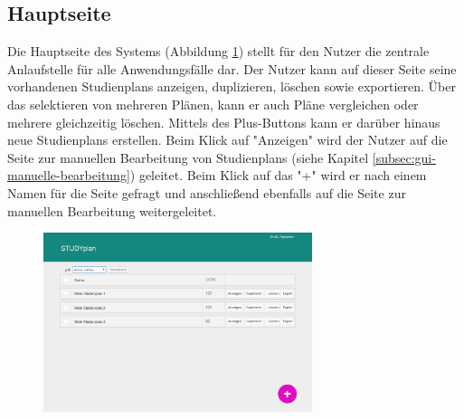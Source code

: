 \subsection{Hauptseite}
\label{subsec:gui-hauptseite}
Die Hauptseite des Systems (Abbildung \ref{fig:gui-hauptseite-1}) stellt für den Nutzer die zentrale Anlaufstelle für alle Anwendungsfälle dar. Der Nutzer kann auf dieser Seite seine vorhandenen \glspl{Studienplan} anzeigen, duplizieren, löschen sowie exportieren. Über das selektieren von mehreren Plänen, kann er auch Pläne vergleichen oder mehrere gleichzeitig löschen. Mittels des Plus-Buttons kann er darüber hinaus neue \glspl{Studienplan} erstellen.\newline
Beim Klick auf "Anzeigen" wird der Nutzer auf die Seite zur manuellen Bearbeitung von \glspl{Studienplan} (siehe Kapitel \ref{subsec:gui-manuelle-bearbeitung}) geleitet. Beim Klick auf das "+" wird er nach einem Namen für die Seite gefragt und anschließend ebenfalls auf die Seite zur manuellen Bearbeitung weitergeleitet.
\begin{figure}[!htb]
	\caption{}
	\label{fig:gui-hauptseite-1}
	\centering
	\includegraphics[width=0.7\textwidth]{../GUI/ergebnisse/hauptseite-1.png}
\end{figure}

